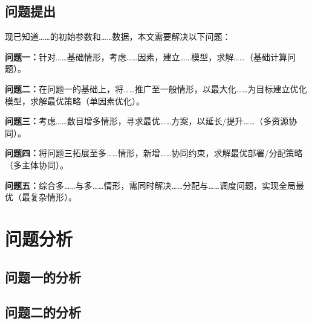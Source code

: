 \documentclass[12pt,a4paper]{ctexart}
\theoremstyle{definition}
\theoremstyle{plain}
\theoremstyle{remark}
\begin{document}
\subsection{问题提出}


现已知道……的初始参数和……数据，本文需要解决以下问题：

\textbf{问题一：}针对……基础情形，考虑……因素，建立……模型，求解……（基础计算问题）。

\textbf{问题二：}在问题一的基础上，将……推广至一般情形，以最大化……为目标建立优化模型，求解最优策略（单因素优化）。

\textbf{问题三：}考虑……数目增多情形，寻求最优……方案，以延长/提升……（多资源协同）。

\textbf{问题四：}将问题三拓展至多……情形，新增……协同约束，求解最优部署/分配策略（多主体协同）。

\textbf{问题五：}综合多……与多……情形，需同时解决……分配与……调度问题，实现全局最优（最复杂情形）。


\section{问题分析}

\subsection{问题一的分析}

%

\subsection{问题二的分析}

%
\end{document}
